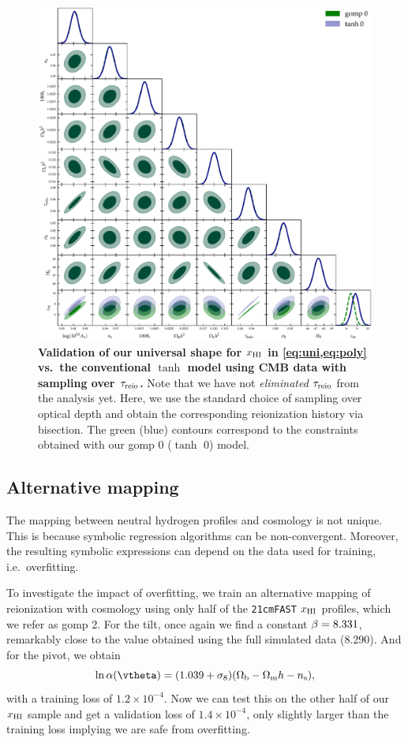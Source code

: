\begin{figure}[t]
\centering
\includegraphics[width=\linewidth]{figs/gomp_tanh_triangle_tau.pdf}
\caption{\textbf{Validation of our universal shape for $x_{\mathrm{HI}}$ in \cref{eq:uni,eq:poly} vs.\ the
conventional $\tanh$ model using CMB data with sampling over $\tau_{\mathrm{reio}}$.}
Note that we have not \emph{eliminated} $\tau_{\mathrm{reio}}$ from the analysis
yet. Here, we use the standard choice of sampling
over optical depth and obtain the corresponding reionization history via bisection.
The green (blue) contours correspond to the constraints obtained with
our gomp 0 ($\tanh$ 0) model.}
\label{fig:tg}
\end{figure}


\subsection*{Alternative mapping}
\label{ssec:0226}

The mapping between neutral hydrogen profiles and cosmology is not
unique.
This is because symbolic regression algorithms can be non-convergent.
Moreover, the resulting symbolic expressions can depend on the data used
for training, i.e.\ overfitting.

To investigate the impact of overfitting, we train an alternative
mapping of reionization with cosmology using only half of the
\texttt{21cmFAST} $x_{\mathrm{HI}}$ profiles, which we refer as gomp 2.
For the tilt, once again we find a constant $\beta = 8.331$, remarkably
close to the value obtained using the full simulated data (8.290).
And for the pivot, we obtain
%
\begin{equation}
\label{eq:SR0226}
\ln\ap(\vtheta) = (1.039 + \sigma_8) (\Omegab - \Omegam h - \ns),
\end{equation}
%
with a training loss of $1.2 \times 10^{-4}$.
Now we can test this on the other half of our $x_{\mathrm{HI}}$ sample and get a
validation loss of $1.4 \times 10^{-4}$, only slightly larger than the
training loss implying we are safe from overfitting.

